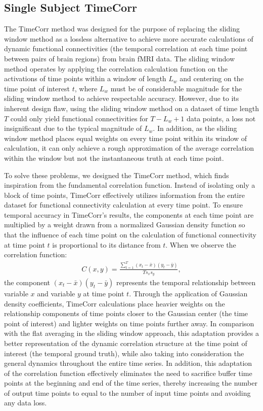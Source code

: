 \documentclass[11pt]{article}
\begin{document}
\subsection{Single Subject TimeCorr}
The TimeCorr method was designed for the purpose of replacing the sliding window method as a lossless alternative to achieve more accurate calculations of dynamic functional connectivities (the temporal correlation at each time point between pairs of brain regions) from brain fMRI data. The sliding window method operates by applying the correlation calculation function on the activations of time points within a window of length $L_w$ and centering on the time point of interest $t$, where $L_w$ must be of considerable magnitude for the sliding window method to achieve respectable accuracy. However, due to its inherent design flaw, using the sliding window method on a dataset of time length $T$ could only yield functional connectivities for $T-L_w+1$ data points, a loss not insignificant due to the typical magnitude of $L_w$. In addition, as the sliding window method places equal weights on every time point within its window of calculation, it can only achieve a rough approximation of the average correlation within the window but not the instantaneous truth at each time point.

To solve these problems, we designed the TimeCorr method, which finds inspiration from the fundamental correlation function. Instead of isolating only a block of time points, TimeCorr effectively utilizes information from the entire dataset for functional connectivity calculation at every time point. To ensure temporal accuracy in TimeCorr's results, the components at each time point are multiplied by a weight drawn from a normalized Gaussian density function so that the influence of each time point on the calculation of functional connectivity at time point $t$ is proportional to its distance from $t$. When we observe the correlation function:
\begin{align*}
C(x,y) = \frac{\sum_{t=1}^T (x_t-\bar{x})(y_t-\bar{y})}{Ts_xs_y},
\end{align*}
the component $(x_t-\bar{x})(y_t-\bar{y})$ represents the temporal relationship between variable $x$ and variable $y$ at time point $t$. Through the application of Gaussian density coefficients, TimeCorr calculations place heavier weights on the relationship components of time points closer to the Gaussian center (the time point of interest) and lighter weights on time points further away. In comparison with the flat averaging in the sliding window approach, this adaptation provides a better representation of the dynamic correlation structure at the time point of interest (the temporal ground truth), while also taking into consideration the general dynamics throughout the entire time series. In addition, this adaptation of the correlation function effectively eliminates the need to sacrifice buffer time points at the beginning and end of the time series, thereby increasing the number of output time points to equal to the number of input time points and avoiding any data loss.
\end{document}
